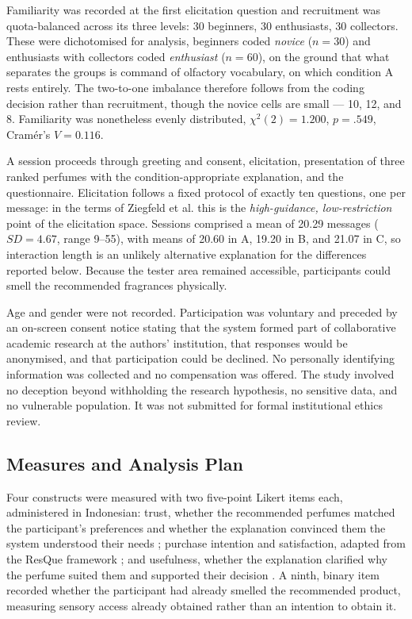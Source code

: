 \documentclass[conference]{IEEEtran}
\begin{document}
Familiarity was recorded at the first elicitation question and recruitment was
quota-balanced across its three levels: 30 beginners, 30 enthusiasts, 30 collectors. These
were dichotomised for analysis, beginners coded \textit{novice} ($n = 30$) and enthusiasts
with collectors coded \textit{enthusiast} ($n = 60$), on the ground that what separates the
groups is command of olfactory vocabulary, on which condition A rests entirely. The
two-to-one imbalance therefore follows from the coding decision rather than recruitment,
though the novice cells are small --- 10, 12, and 8. Familiarity was nonetheless evenly
distributed, $\chi^{2}(2) = 1.200$, $p = .549$, Cram\'{e}r's $V = 0.116$.

A session proceeds through greeting and consent, elicitation, presentation of three ranked
perfumes with the condition-appropriate explanation, and the questionnaire. Elicitation
follows a fixed protocol of exactly ten questions, one per message: in the terms of Ziegfeld
et al. \cite{ziegfeld2025} this is the \textit{high-guidance, low-restriction} point of the
elicitation space. Sessions comprised a mean of 20.29 messages ($SD = 4.67$, range 9--55),
with means of 20.60 in A, 19.20 in B, and 21.07 in C, so interaction length is an unlikely
alternative explanation for the differences reported below. Because the tester area remained
accessible, participants could smell the recommended fragrances physically.

Age and gender were not recorded. Participation was voluntary and preceded by an on-screen
consent notice stating that the system formed part of collaborative academic research at
the authors' institution, that responses would be anonymised, and that participation could
be declined. No personally identifying information was collected and no compensation was
offered. The study involved no deception beyond withholding the research hypothesis, no
sensitive data, and no vulnerable population. It was not submitted for formal institutional
ethics review.

\subsection{Measures and Analysis Plan}

Four constructs were measured with two five-point Likert items each, administered in
Indonesian: trust, whether the recommended perfumes matched the participant's preferences
and whether the explanation convinced them the system understood their needs
\cite{mcknight2002}; purchase intention and satisfaction, adapted from the ResQue framework
\cite{pu2012}; and usefulness, whether the explanation clarified why the perfume suited them
and supported their decision \cite{davis1989}. A ninth, binary item recorded whether the
participant had already smelled the recommended product, measuring sensory access already
obtained rather than an intention to obtain it.
\end{document}
